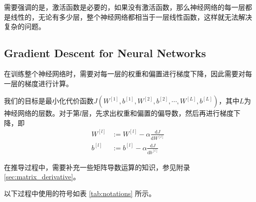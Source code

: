需要强调的是，激活函数是必要的，如果没有激活函数，那么神经网络的每一层都是线性的，无论有多少层，整个神经网络都相当于一层线性函数，这样就无法解决复杂的问题。

\subsection{Gradient Descent for Neural Networks}
在训练整个神经网络时，需要对每一层的权重和偏置进行梯度下降，因此需要对每一层的梯度进行计算。

\vspace{0.5\baselineskip}
我们的目标是最小化代价函数$J(W^{[1]}, b^{[1]}, W^{[2]}, b^{[2]}, \cdots, W^{[L]}, b^{[L]})$，其中$L$为神经网络的层数。对于第$l$层，先求出权重和偏置的偏导数，然后再进行梯度下降，即
\begin{equation}
	\begin{aligned}
		W^{[l]} &:= W^{[l]} - \alpha \frac{\mathrm{d}J}{\mathrm{d}W^{[l]}} \\
		b^{[l]} &:= b^{[l]} - \alpha \frac{\mathrm{d}J}{\mathrm{d}b^{[l]}}
	\end{aligned}
\end{equation}

在推导过程中，需要补充一些矩阵导数运算的知识，参见附录 \ref{sec:matrix_derivative}。

以下过程中使用的符号如表 \ref{tab:notations} 所示。
